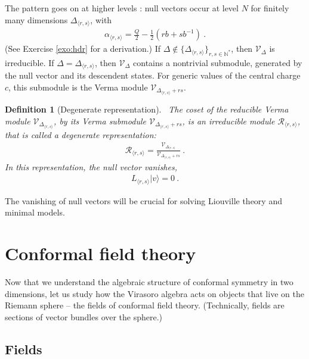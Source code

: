 \documentclass[12pt, a4paper]{article}
\theoremstyle{break}
\newtheorem{defn}[exo]{Definition}
\begin{document}
The pattern goes on at higher levels \cite{fms97}: null vectors occur at level $N$ for finitely many dimensions $\Delta_{\langle r,s\rangle}$, with
\begin{align}
  \alpha_{\langle r,s\rangle} = \frac{Q}{2} - \frac12(rb+sb^{-1})\ .
  \label{eq:ars}
 \end{align}
 (See Exercise \ref{exo:hdr} for a derivation.)
If $\Delta\notin\{\Delta_{\langle r,s\rangle}\}_{r,s\in\mathbb{N}^*}$, then $\mathcal V_\Delta$ is irreducible. If $\Delta = \Delta_{\langle r,s\rangle}$, then $\mathcal V_\Delta$ contains a nontrivial submodule, generated by the null vector and its descendent states. For generic values of the central charge $c$, this submodule is the Verma module $\mathcal V_{\Delta_{\langle r,s\rangle}+rs}$.

\begin{defn}[Degenerate representation]
 ~\label{def:deg}
The coset of the reducible Verma module $\mathcal V_{\Delta_{\langle r,s\rangle}}$, by its Verma submodule $\mathcal V_{\Delta_{\langle r,s\rangle}+rs}$, is an irreducible module $\mathcal{R}_{\langle r,s\rangle}$, that is called a degenerate representation:
\begin{align}
 \mathcal{R}_{\langle r,s\rangle} = \frac{\mathcal V_{\Delta_{\langle r,s\rangle}}}{\mathcal V_{\Delta_{\langle r,s\rangle}+rs}}\ .
\end{align}
In this representation, the null vector vanishes,
\begin{align}
 L_{\langle r,s\rangle}|v\rangle = 0\ .
\end{align}
\end{defn}
The vanishing of null vectors will be crucial for solving Liouville theory and minimal models.


\section{Conformal field theory}\label{sec:cft}

Now that we understand the algebraic structure of conformal symmetry in two dimensions, let us study how the Virasoro algebra acts on objects that live on the Riemann sphere -- the fields of conformal field theory. (Technically, fields are sections of vector bundles over the sphere.)

\subsection{Fields}
\end{document}
